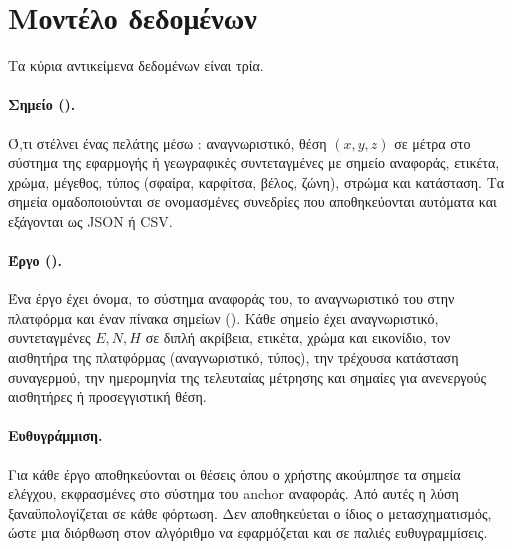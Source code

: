 
\section{Μοντέλο δεδομένων}
\label{sec:datamodel}

Τα κύρια αντικείμενα δεδομένων είναι τρία.

\paragraph{Σημείο ().} Ό,τι στέλνει ένας πελάτης μέσω : αναγνωριστικό, θέση $(x, y, z)$ σε μέτρα στο σύστημα της εφαρμογής ή γεωγραφικές συντεταγμένες με σημείο αναφοράς, ετικέτα, χρώμα, μέγεθος, τύπος (σφαίρα, καρφίτσα, βέλος, ζώνη), στρώμα και κατάσταση. Τα σημεία ομαδοποιούνται σε ονομασμένες συνεδρίες που αποθηκεύονται αυτόματα και εξάγονται ως JSON ή CSV.

\paragraph{Έργο ().} Ένα έργο έχει όνομα, το σύστημα αναφοράς του, το αναγνωριστικό του στην πλατφόρμα και έναν πίνακα σημείων (). Κάθε σημείο έχει αναγνωριστικό, συντεταγμένες $E, N, H$ σε διπλή ακρίβεια, ετικέτα, χρώμα και εικονίδιο, τον αισθητήρα της πλατφόρμας (αναγνωριστικό, τύπος), την τρέχουσα κατάσταση συναγερμού, την ημερομηνία της τελευταίας μέτρησης και σημαίες για ανενεργούς αισθητήρες ή προσεγγιστική θέση.

\paragraph{Ευθυγράμμιση.} Για κάθε έργο αποθηκεύονται οι θέσεις όπου ο χρήστης ακούμπησε τα σημεία ελέγχου, εκφρασμένες στο σύστημα του anchor αναφοράς. Από αυτές η λύση ξαναϋπολογίζεται σε κάθε φόρτωση. Δεν αποθηκεύεται ο ίδιος ο μετασχηματισμός, ώστε μια διόρθωση στον αλγόριθμο να εφαρμόζεται και σε παλιές ευθυγραμμίσεις.

